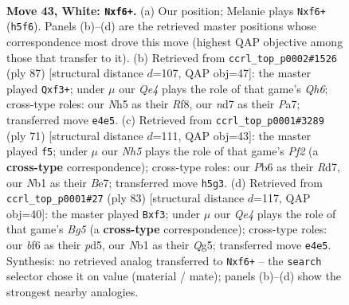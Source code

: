 \documentclass[11pt]{article}
\begin{document}
\clearpage

\begin{figure}[p]\centering
\begin{subfigure}{0.46\textwidth}\centering
\resizebox{\linewidth}{!}{%
\newchessgame
\chessboard[
  setfen={2b1k3/p2n1r1p/1P3b1B/4qP1N/1p1pQ3/8/p3P3/1N1K2R1 w - - 2 43},
  showmover=false,
  pgfstyle=straightmove, color=movearrow, markmove={h5-f6}
]}
\caption{}
\end{subfigure}\hfill
\begin{subfigure}{0.46\textwidth}\centering
\resizebox{\linewidth}{!}{%
\newchessgame
\chessboard[
  setfen={5r2/p5kp/1p1n1pN1/1P6/3P2P1/3B1Q1q/5K1b/1R2B3 b - - 6 44},
  showmover=false,
  pgfstyle=straightmove, color=movearrow, markmove={h3-f3}
]}
\caption{}
\end{subfigure}
\\[4pt]
\begin{subfigure}{0.46\textwidth}\centering
\resizebox{\linewidth}{!}{%
\newchessgame
\chessboard[
  setfen={6k1/3rbpp1/pB2p1q1/8/2P1Q1P1/1P1n4/P4N1P/5RK1 b - - 4 36},
  showmover=false,
  pgfstyle=straightmove, color=movearrow, markmove={f7-f5}
]}
\caption{}
\end{subfigure}\hfill
\begin{subfigure}{0.46\textwidth}\centering
\resizebox{\linewidth}{!}{%
\newchessgame
\chessboard[
  setfen={4r1k1/5p2/7p/3PP1q1/Pp2Nnbb/1P3Q2/5PB1/2R1R1K1 b - - 2 42},
  showmover=false,
  pgfstyle=straightmove, color=movearrow, markmove={g4-f3}
]}
\caption{}
\end{subfigure}
\caption{\textbf{Move 43, White: \texttt{Nxf6+}.} (a) Our position; Melanie plays \texttt{Nxf6+} (\texttt{h5f6}). Panels (b)--(d) are the retrieved master positions whose correspondence most drove this move (highest QAP objective among those that transfer to it). (b) Retrieved from \texttt{ccrl\_top\_p0002\#1526} (ply 87) [structural distance $d$=107, QAP obj=47]: the master played \texttt{Qxf3+}; under $\mu$ our \emph{Qe4} plays the role of that game's \emph{Qh6}; cross-type roles: our \emph{N}h5 as their \emph{R}f8, our \emph{n}d7 as their \emph{P}a7; transferred move \texttt{e4e5}. (c) Retrieved from \texttt{ccrl\_top\_p0001\#3289} (ply 71) [structural distance $d$=111, QAP obj=43]: the master played \texttt{f5}; under $\mu$ our \emph{Nh5} plays the role of that game's \emph{Pf2} (a \textbf{cross-type} correspondence); cross-type roles: our \emph{P}b6 as their \emph{R}d7, our \emph{N}b1 as their \emph{B}e7; transferred move \texttt{h5g3}. (d) Retrieved from \texttt{ccrl\_top\_p0001\#27} (ply 83) [structural distance $d$=117, QAP obj=40]: the master played \texttt{Bxf3}; under $\mu$ our \emph{Qe4} plays the role of that game's \emph{Bg5} (a \textbf{cross-type} correspondence); cross-type roles: our \emph{b}f6 as their \emph{p}d5, our \emph{N}b1 as their \emph{Q}g5; transferred move \texttt{e4e5}. Synthesis: no retrieved analog transferred to \texttt{Nxf6+} -- the \texttt{search} selector chose it on value (material / mate); panels (b)--(d) show the strongest nearby analogies.}
\label{fig:thought-m84}
\end{figure}
\end{document}
